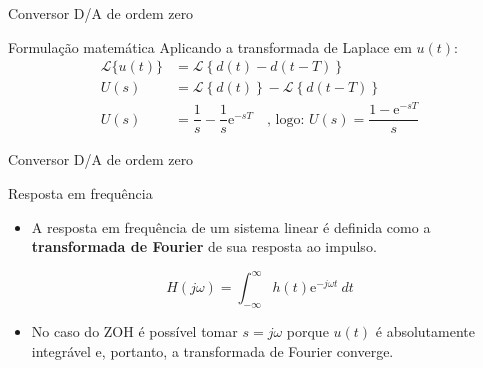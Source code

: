 \begin{frame}{Conversor D/A de ordem zero}
\begin{block}{Formulação matemática}
Aplicando a transformada de Laplace em $ u(t) $:
\begin{align*}
	\mathcal{L}\{u(t)\}&=\mathcal{L}\left\lbrace d(t)-d(t-T)\right\rbrace \\
				 U(s)&=\mathcal{L}\left\lbrace d(t)\right\rbrace -\mathcal{L}\left\lbrace d(t-T)\right\rbrace \\
				 U(s)&=\dfrac{1}{s}-\dfrac{1}{s}\text{e}^{-sT}\quad \text{, logo: }\boxed{U(s)=\dfrac{1-\text{e}^{-sT}}{s}}
\end{align*}
\end{block}
\end{frame}

\begin{frame}{Conversor D/A de ordem zero}
\begin{block}{Resposta em frequência}
\begin{itemize}
    \item A resposta em frequência de um sistema linear é definida como a \textbf{transformada de Fourier} de sua resposta ao impulso.
\end{itemize}

\begin{equation*}
H(j\omega) = \int_{-\infty}^{\infty} h(t) \text{e}^{-j\omega t} \ dt
\end{equation*}

\begin{itemize}
    \item No caso do ZOH é possível tomar $s = j\omega$ porque  $u(t)$ é absolutamente integrável e, portanto,  a transformada de Fourier converge.
\end{itemize}
\end{block}
\end{frame}

